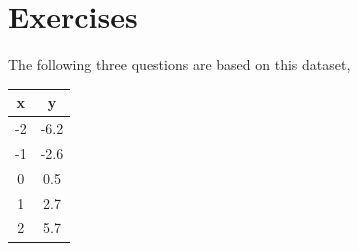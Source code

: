 \documentclass{article}
\newcommand{\bracket}[3]{\left#1 #3 \right#2}
\renewcommand{\b}{\bracket{(}{)}}
\newcommand{\x}{\mathbf{x}}
\newcommand{\y}{\mathbf{y}}
\newcommand{\X}{\mathbf{X}}
\newcommand{\I}{\mathbf{I}}
\newcommand{\w}{\mathbf{w}}
\newcommand{\wo}{\w^*}
\renewcommand{\L}{\mathcal{L}}
\begin{document}




\section{Exercises}
The following three questions are based on this dataset,

\begin{center}
\begin{tabular}{c c}
  \toprule
  x & y \\
  \midrule
  -2 & -6.2\\
  -1 & -2.6\\
  0 &  0.5\\
  1 & 2.7\\
  2 & 5.7\\
  \bottomrule
\end{tabular}
\end{center}
\end{document}
